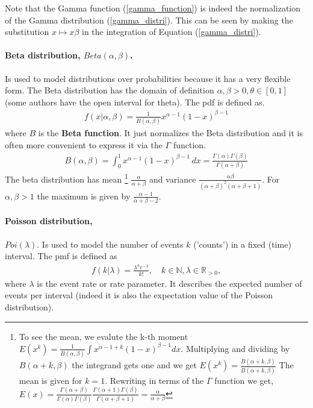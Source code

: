 Note that the Gamma function (\ref{gamma_function}) is indeed the normalization of the Gamma distribution (\ref{gamma_distri}). This can be seen by making the substitution $x\mapsto x\beta$ in the integration of Equation (\ref{gamma_distri}).

\paragraph*{Beta distribution, $Beta(\alpha, \beta)$.} Is used to model distributions over probabilities because it has a very flexible form. The Beta distribution has the domain of definition $\alpha, \beta > 0, \theta \in [0,1]$ (some authors have the open interval for theta). The pdf is defined as.
\begin{align}
f(x|\alpha, \beta) = \frac{1}{B(\alpha, \beta)}x^{\alpha-1}(1-x)^{\beta-1}
\end{align} 
where $B$ is the \textbf{Beta function}. It just normalizes the Beta distribution and it is often more convenient to express it via the $\Gamma$ function.
\begin{align}
B(\alpha, \beta) = \int_0^1 x^{\alpha-1}(1-x)^{\beta-1}\,dx = \frac{\Gamma(\alpha) \Gamma(\beta)}{\Gamma(\alpha + \beta)}
\end{align}
The beta distribution has mean \footnote{To see the mean, we evalute the k-th moment $E(x^k) =  \frac{1}{B(\alpha, \beta)}\int x^{\alpha-1 + k}(1-x)^{\beta-1} dx$. Multiplying and dividing by $B(\alpha+k, \beta)$ the integrand gets one and we get $E(x^k) = \frac{B(\alpha+k, \beta)}{B(\alpha+k, \beta)}$ The mean is given for $k=1$. Rewriting in terms of the $\Gamma$ function  we get, $E(x) = \frac{\Gamma(\alpha + \beta)}{\Gamma(\alpha) \Gamma(\beta)} \frac{\Gamma(\alpha + 1) \Gamma(\beta)}{\Gamma(\alpha+\beta+1)} = \frac{\alpha}{\alpha+\beta}$} 
$\frac{\alpha}{\alpha + \beta}$ and variance $\frac{\alpha \beta}{(\alpha+\beta)^2 (\alpha+\beta+1)} $. For $\alpha, \beta > 1$ the maximum is given by $\frac{\alpha-1}{\alpha+\beta -2}$. 

\paragraph*{Poisson distribution,} $Poi(\lambda)$. Is used to model  the number of events $k$ ('counts') in a fixed (time) interval. The pmf is defined as 
\begin{align}
f(k|\lambda) = \frac{\lambda^k e^{-\lambda}}{k!}, \quad k\in \mathbb{N}, \lambda \in \mathbb{R}_{>0},
\end{align} 
where $\lambda$ is the event rate or rate parameter. It describes the expected number of events per interval (indeed it is also the expectation value of the Poisson distribution).

